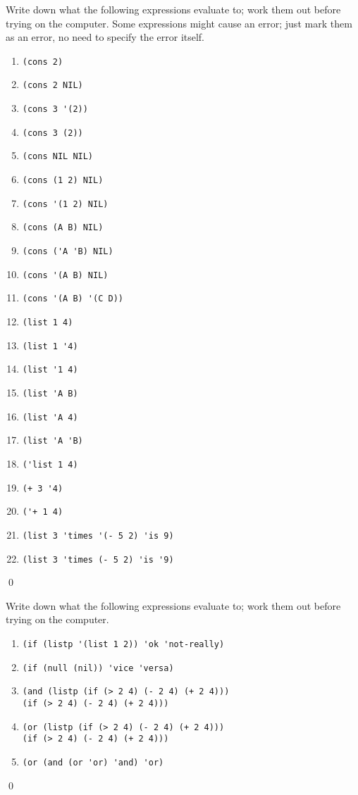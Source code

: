 \documentclass[a4paper,11pt]{article}
\begin{document}
\begin{uexercise}

Write down what the following expressions evaluate to; work them out before trying on the computer. Some expressions might cause an error; just mark them as an error, no need to specify the error itself.

\begin{enumerate}
\item \Verb=(cons 2)=
\item \Verb=(cons 2 NIL)=
\item \Verb=(cons 3 '(2))=
\item \Verb=(cons 3 (2))=
\item \Verb=(cons NIL NIL)=
\item \Verb=(cons (1 2) NIL)=
\item \Verb=(cons '(1 2) NIL)=
\item \Verb=(cons (A B) NIL)=
\item \Verb=(cons ('A 'B) NIL)=
\item \Verb=(cons '(A B) NIL)=
\item \Verb=(cons '(A B) '(C D))=
\item \Verb=(list 1 4)=
\item \Verb=(list 1 '4)=
\item \Verb=(list '1 4)=
\item \Verb=(list 'A B)=
\item \Verb=(list 'A 4)=
\item \Verb=(list 'A 'B)=
\item \Verb=('list 1 4)=
\item \Verb=(+ 3 '4)=
\item \Verb=('+ 1 4)=
\item \Verb=(list 3 'times '(- 5 2) 'is 9)=
\item \Verb=(list 3 'times (- 5 2) 'is '9)=
\end{enumerate}

\qed
\end{uexercise}

\begin{uexercise}
Write down what the following expressions evaluate to; work them out before trying on the computer.

\begin{enumerate}
\item \Verb=(if (listp '(list 1 2)) 'ok 'not-really)=
\item \Verb+(if (null (nil)) 'vice 'versa)+
\item \Verb=(and (listp (if (> 2 4) (- 2 4) (+ 2 4)))=\\
\Verb=(if (> 2 4) (- 2 4) (+ 2 4)))=
\item \Verb=(or (listp (if (> 2 4) (- 2 4) (+ 2 4)))=\\
\Verb=(if (> 2 4) (- 2 4) (+ 2 4)))=
\item \Verb=(or (and (or 'or) 'and) 'or)= 
\end{enumerate}

\qed
\end{uexercise}
\end{document}
